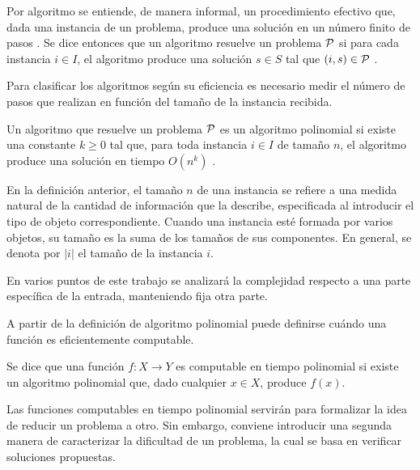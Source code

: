 Por algoritmo se entiende, de manera informal, un procedimiento efectivo que, dada una instancia de un problema, produce una solución en un número finito de pasos \cite{Cormen2009IntroductionTA}. Se dice entonces que un algoritmo resuelve un problema $\mathcal{P}$ si para cada instancia $i \in I$, el algoritmo produce una solución $s \in S$ tal que $(i, s) \in \mathcal{P}$ \cite{Cormen2009IntroductionTA}.

Para clasificar los algoritmos según su eficiencia es necesario medir el número de pasos que realizan en función del tamaño de la instancia recibida.

\begin{definition}
	Un algoritmo que resuelve un problema $\mathcal{P}$ es un algoritmo polinomial si existe una constante $k \geq 0$ tal que, para toda instancia $i \in I$ de tamaño $n$, el algoritmo produce una solución en tiempo $O(n^k)$ \cite{Cormen2009IntroductionTA}.
\end{definition}

En la definición anterior, el tamaño $n$ de una instancia se refiere a una medida natural de la cantidad de información que la describe, especificada al introducir el tipo de objeto correspondiente. Cuando una instancia esté formada por varios objetos, su tamaño es la suma de los tamaños de sus componentes. En general, se denota por $|i|$ el tamaño de la instancia $i$.

En varios puntos de este trabajo se analizará la complejidad respecto a una parte específica de la entrada, manteniendo fija otra parte.


A partir de la definición de algoritmo polinomial puede definirse cuándo una función es eficientemente computable.

\begin{definition}
	Se dice que una función $f: X \to Y$ es computable en tiempo polinomial si existe un algoritmo polinomial que, dado cualquier $x \in X$, produce $f(x)$.
\end{definition}

Las funciones computables en tiempo polinomial servirán para formalizar la idea de reducir un problema a otro. Sin embargo, conviene introducir una segunda manera de caracterizar la dificultad de un problema, la cual se basa en verificar soluciones propuestas.

